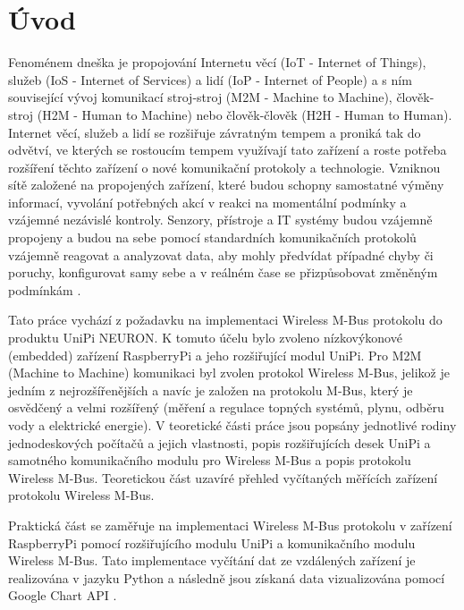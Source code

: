 \chapter*{Úvod}
{}

Fenoménem dneška je propojování Internetu věcí (IoT - Internet of Things), služeb (IoS - Internet of Services) a lidí (IoP - Internet of People) a s ním související vývoj komunikací stroj-stroj (M2M - Machine to Machine), člověk-stroj (H2M - Human to Machine) nebo člověk-člověk (H2H - Human to Human). Internet věcí, služeb a lidí se rozšiřuje závratným tempem a proniká tak do odvětví, ve kterých se rostoucím tempem využívají tato zařízení a roste potřeba rozšíření těchto zařízení o nové komunikační protokoly a technologie. Vzniknou sítě založené na propojených zařízení, které budou schopny samostatné výměny informací, vyvolání potřebných akcí v reakci na momentální podmínky a vzájemné nezávislé kontroly. Senzory, přístroje a IT systémy budou vzájemně propojeny a budou na sebe pomocí standardních komunikačních protokolů vzájemně reagovat a analyzovat data, aby mohly předvídat případné chyby či poruchy, konfigurovat samy sebe a v reálném čase se přizpůsobovat změněným 
podmínkám \cite{uvod_prumysl_4_pdf,uvod_prumysl_4_web}.

Tato práce vychází z požadavku na implementaci Wireless M-Bus protokolu do produktu UniPi NEURON. K tomuto účelu bylo zvoleno nízkovýkonové (embedded) zařízení RaspberryPi a jeho rozšiřující modul UniPi. Pro M2M (Machine to Machine) komunikaci byl zvolen protokol Wireless M-Bus, jelikož je jedním z nejrozšířenějších a navíc je založen na protokolu M-Bus, který je osvědčený a velmi rozšířený (měření a regulace topných systémů, plynu, odběru vody a elektrické energie). V teoretické části práce jsou popsány jednotlivé rodiny jednodeskových počítačů a jejich vlastnosti, popis rozšiřujících desek UniPi a samotného komunikačního modulu pro Wireless M-Bus a popis protokolu Wireless M-Bus. Teoretickou část uzavíré přehled vyčítaných měřících zařízení protokolu Wireless M-Bus. 

Praktická část se zaměřuje na implementaci Wireless M-Bus protokolu v zařízení RaspberryPi pomocí rozšiřujícího modulu UniPi a komunikačního modulu Wireless M-Bus. Tato implementace vyčítání dat ze vzdálených zařízení je realizována v jazyku Python a následně jsou získaná data vizualizována pomocí Google Chart API \cite{uvod_google_charts_api}.


 